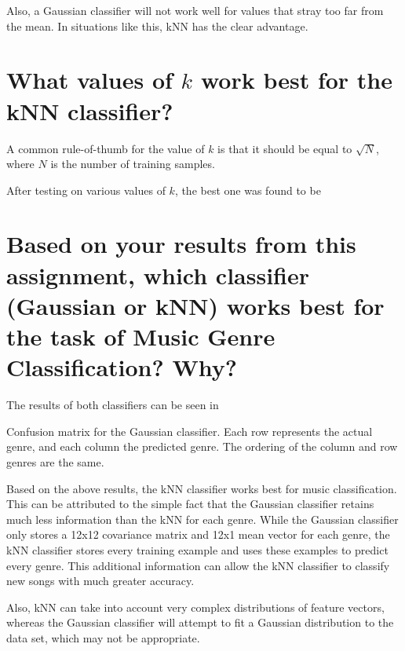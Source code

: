 \documentclass[a4paper,titlepage]{article}
\begin{document}
	
	Also, a Gaussian classifier will not work well for values that stray too far from the mean. In situations like this, kNN has the clear advantage.
	
	
	
	\section{What values of $k$ work best for the kNN classifier?}
	
	A common rule-of-thumb for the value of $k$ is that it should be equal to $\sqrt{N}$, where $N$ is the number of training samples. %
	
	After testing on various values of $k$, the best one was found to be %
	
	\section{Based on your results from this assignment, which classifier (Gaussian or kNN) works best for the task of Music Genre Classification? Why?}
	
	The results of both classifiers can be seen in %
	
	\begin{table*}[!htb]
		\centering
		\caption{Confusion matrix for the Gaussian classifier. Each row represents the actual genre, and each column the predicted genre. The ordering of the column and row genres are the same.}
		\label{table:confusion_gaussian}
	\end{table*}
	
	Based on the above results, the kNN classifier works best for music classification. This can be attributed to the simple fact that the Gaussian classifier retains much less information than the kNN for each genre. While the Gaussian classifier only stores a 12x12 covariance matrix and 12x1 mean vector for each genre, the kNN classifier stores every training example and uses these examples to predict every genre. This additional information can allow the kNN classifier to classify new songs with much greater accuracy. 
	
	Also, kNN can take into account very complex distributions of feature vectors, whereas the Gaussian classifier will attempt to fit a Gaussian distribution to the data set, which may not be appropriate.
	
	
	
\end{document}
